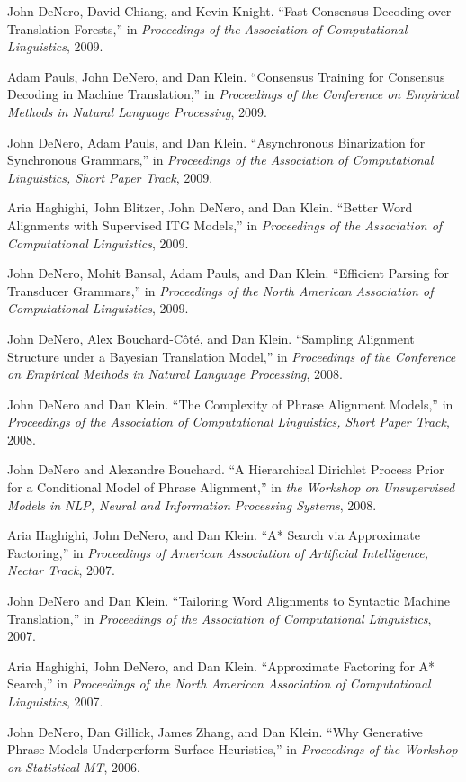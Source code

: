 \documentclass[margin,line]{res}
\begin{document}
\begin{resume}
John DeNero, David Chiang, and Kevin Knight. ``Fast Consensus Decoding over Translation Forests,'' in {\it Proceedings of the Association of Computational Linguistics}, 2009.

Adam Pauls, John DeNero, and Dan Klein. ``Consensus Training for Consensus Decoding in Machine Translation,'' in {\it Proceedings of the Conference on Empirical Methods in Natural Language Processing}, 2009.

John DeNero, Adam Pauls, and Dan Klein. ``Asynchronous Binarization for Synchronous Grammars,'' in {\it Proceedings of the Association of Computational Linguistics, Short Paper Track}, 2009.

Aria Haghighi, John Blitzer, John DeNero, and Dan Klein. ``Better Word Alignments with Supervised ITG Models,'' in {\it Proceedings of the Association of Computational Linguistics}, 2009.

John DeNero, Mohit Bansal, Adam Pauls, and Dan Klein. ``Efficient Parsing for Transducer Grammars,'' in {\it Proceedings of the North American Association of Computational Linguistics}, 2009.

John DeNero, Alex Bouchard-Côté, and Dan Klein. ``Sampling Alignment Structure under a Bayesian Translation Model,'' in {\it Proceedings of the Conference on Empirical Methods in Natural Language Processing}, 2008.

John DeNero and Dan Klein. ``The Complexity of Phrase Alignment Models,'' in {\it Proceedings of the Association of Computational Linguistics, Short Paper Track}, 2008.

John DeNero and Alexandre Bouchard. ``A Hierarchical Dirichlet Process Prior for a Conditional Model of Phrase Alignment,'' in {\it the Workshop on Unsupervised Models in NLP, Neural and Information Processing Systems}, 2008.

Aria Haghighi, John DeNero, and Dan Klein. ``A* Search via Approximate Factoring,'' in {\it Proceedings of American Association of Artificial Intelligence, Nectar Track}, 2007.

John DeNero and Dan Klein. ``Tailoring Word Alignments to Syntactic Machine Translation,'' in {\it Proceedings of the Association of Computational Linguistics}, 2007.

Aria Haghighi, John DeNero, and Dan Klein. ``Approximate Factoring for A* Search,'' in {\it Proceedings of the North American Association of Computational Linguistics}, 2007.

John DeNero, Dan Gillick, James Zhang, and Dan Klein. ``Why Generative Phrase Models Underperform Surface Heuristics,'' in {\it Proceedings of the Workshop on Statistical MT}, 2006.


\end{resume}
\end{document}
